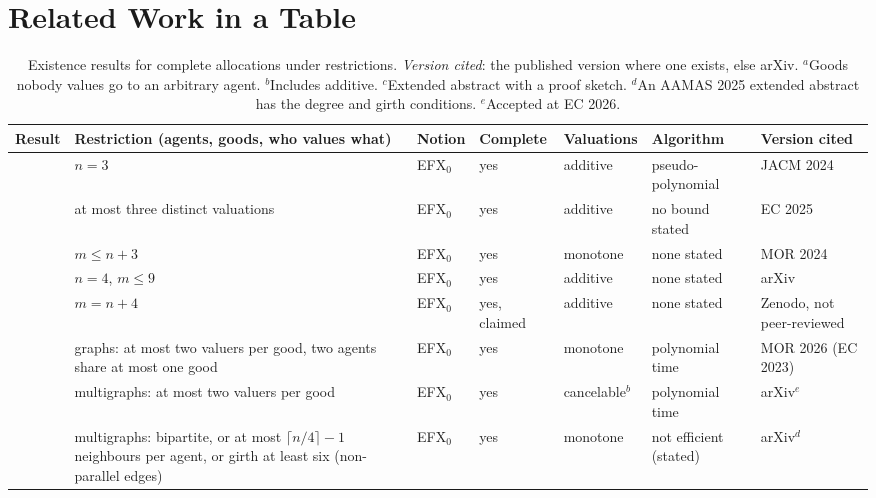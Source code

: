 \documentclass[runningheads,11pt]{llncs}
\newcommand{\efxz}{\texorpdfstring{\mbox{EFX$_0$}}{EFX0}}
\begin{document}
\section{Related Work in a Table}\label{app:rw}

\begin{table}[!htbp]
\caption{Existence results for complete allocations under restrictions. \emph{Version cited}: the published version where one exists, else arXiv. $^a$Goods nobody values go to an arbitrary agent. $^b$Includes additive. $^c$Extended abstract with a proof sketch. $^d$An AAMAS 2025 extended abstract has the degree and girth conditions. $^e$Accepted at EC 2026.}\label{tab:rw}
\centering\scriptsize
\setlength{\tabcolsep}{3pt}\begin{tabular}{@{}>{\raggedright\arraybackslash}p{}>{\raggedright\arraybackslash}p{}>{\raggedright\arraybackslash}p{}>{\raggedright\arraybackslash}p{}>{\raggedright\arraybackslash}p{}>{\raggedright\arraybackslash}p{}>{\raggedright\arraybackslash}p{}@{}}
\toprule
Result & Restriction (agents, goods, who values what) & Notion & Complete & Valuations & Algorithm & Version cited \\
\midrule
\cite{ChaudhuryGM20} & $n=3$ & \efxz{} & yes & additive & pseudo-polynomial & JACM 2024 \\
\cite{HVGNV25} & at most three distinct valuations & \efxz{} & yes & additive & no bound stated & EC 2025 \\
\cite{Mahara21} & $m\le n+3$ & \efxz{} & yes & monotone & none stated & MOR 2024 \\
\cite{AlkassarFM26} & $n=4$, $m\le9$ & \efxz{} & yes & additive & none stated & arXiv \\
\cite{Bratby26} & $m=n+4$ & \efxz{} & yes, claimed & additive & none stated & Zenodo, not peer-reviewed \\
\cite{ChristodoulouFKS23} & graphs: at most two valuers per good, two agents share at most one good & \efxz{} & yes & monotone & polynomial time & MOR 2026 (EC 2023) \\
\cite{AfshinmehrAMMS26} & multigraphs: at most two valuers per good & \efxz{} & yes & cancelable$^b$ & polynomial time & arXiv$^e$ \\
\cite{SgouritsaS25} & multigraphs: bipartite, or at most $\lceil n/4\rceil-1$ neighbours per agent, or girth at least six (non-parallel edges) & \efxz{} & yes & monotone & not efficient (stated) & arXiv$^d$ \\

\end{tabular}
\end{table}
\end{document}
